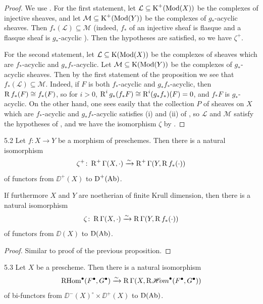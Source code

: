 \begin{proof}
We use . For the first statement, let $\mathcal{L}\subseteq\operatorname{K}^+(\operatorname{Mod}(X))$ be the complexes of injective sheaves, and let $\mathcal{M}\subseteq\operatorname{K}^+(\operatorname{Mod}(Y))$ be the complexes of $g_*$-acyclic sheaves. Then $f_*(\mathcal{L})\subseteq\mathcal{M}$ (indeed, $f_*$ of an injective sheaf is flasque \cite[\nopp $0_{\mathrm{III}}$, 12.2.4]{EGA} and a flasque sheaf is $g_*$-acyclic \cite[\nopp $0_{\mathrm{III}}$, 12.2.1]{EGA}). Then the hypotheses are satisfied, so we have $\zeta^+$.

For the second statement, let $\mathcal{L}\subseteq\operatorname{K}(\operatorname{Mod}(X))$ be the complexes of sheaves which are $f_*$-acyclic and $g_*f_*$-acyclic. Let $\mathcal{M}\subseteq\operatorname{K}(\operatorname{Mod}(Y))$ be the complexes of $g_*$-acyclic sheaves. Then by the first statement of the proposition we see that $f_*(\mathcal{L})\subseteq\mathcal{M}$. Indeed, if $F$ is both $f_*$-acyclic and $g_*f_*$-acyclic, then $\operatorname{R} f_*(F)\cong f_*(F)$, so for $i>0$, $\operatorname{R}^ig_*(f_*F)\cong\operatorname{R}^i(g_*f_*)(F)=0$, and $f_*F$ is $g_*$-acyclic. On the other hand, one sees easily that the collection $P$ of sheaves on $X$ which are $f_*$-acyclic and $g_*f_*$-acyclic satisfies (i) and (ii) of , so $\mathcal{L}$ and $\mathcal{M}$ satisfy the hypotheses of , and we have the isomorphism $\zeta$ by .
\end{proof}

\begin{bookproposition}{5.2}\label{prop:2.5.2}
Let $f\colon X\to Y$ be a morphism of preschemes. Then there is a natural isomorphism
\[
\zeta^+\colon \operatorname{R}^+\Gamma(X,\cdot) \xrightarrow{\sim} \operatorname{R}^+\Gamma(Y,\operatorname{R} f_*(\cdot))
\]
of functors from $\DD^+(X)$ to $\operatorname{D}^+(\operatorname{Ab})$.

If furthermore $X$ and $Y$ are noetherian of finite Krull dimension, then there is a natural isomorphism
\[
\zeta\colon \operatorname{R}\Gamma(X,\cdot) \xrightarrow{\sim} \operatorname{R}\Gamma(Y,\operatorname{R} f_*(\cdot))
\]
of functors from $\DD(X)$ to $\operatorname{D}(\operatorname{Ab})$.
\end{bookproposition}

\begin{proof}
Similar to proof of the previous proposition.
\end{proof}

\begin{bookproposition}{5.3}\label{prop:2.5.3}
Let $X$ be a prescheme. Then there is a natural isomorphism
\[
\operatorname{RHom}^\bullet(F^\bullet,G^\bullet) \xrightarrow{\sim} \operatorname{R}\Gamma(X,\mathop{\mathrm{R}\mathscr{H}\!om}\nolimits^\bullet(F^\bullet,G^\bullet))
\]
of bi-functors from $\DD^-(X)^\circ\times\DD^+(X)$ to $\operatorname{D}(\operatorname{Ab})$.
\end{bookproposition}

